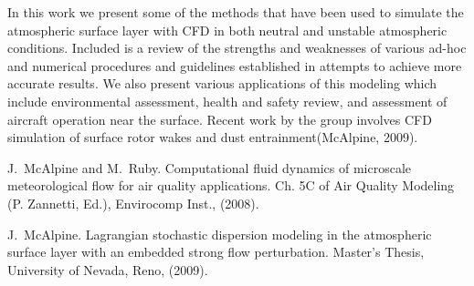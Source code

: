 In this work we present some of the methods that have been used to simulate the atmospheric surface layer with CFD in both neutral and unstable atmospheric conditions. Included is a review of the strengths and weaknesses of various ad-hoc and numerical procedures and guidelines established in attempts to achieve more accurate results. We also present various applications of this modeling which include environmental assessment, health and safety review, and assessment of aircraft 
operation near the surface. Recent work by the group involves CFD simulation of surface rotor wakes and dust entrainment(McAlpine, 2009).


\begin{thebibliography}{10}

{\sc J.~McAlpine and M.~Ruby}. {Computational fluid dynamics of microscale meteorological flow for air quality applications}. Ch. 5C of Air Quality Modeling (P. Zannetti, Ed.), Envirocomp Inst., (2008).

{\sc J.~McAlpine}. {Lagrangian stochastic dispersion modeling in the atmospheric surface layer with an embedded strong flow perturbation}. Master's Thesis,  University of Nevada, Reno, (2009).

\end{thebibliography}